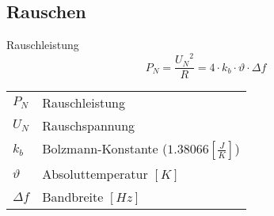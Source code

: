 



\subsection{Rauschen}
Rauschleistung
\[ P_N = \frac{{U_N}^2}{R} = 4 \cdot k_b \cdot \vartheta \cdot \Delta f \]
\begin{tabular}{@{}lp{}}
  $P_N$         & Rauschleistung \\
  $U_N$         & Rauschspannung \\
  $k_b$         & Bolzmann-Konstante ($1.38066 [\frac{J}{K}]$) \\
  $\vartheta$   & Absoluttemperatur $[K]$\\
  $\Delta f$    & Bandbreite $[Hz]$ \\
\end{tabular}